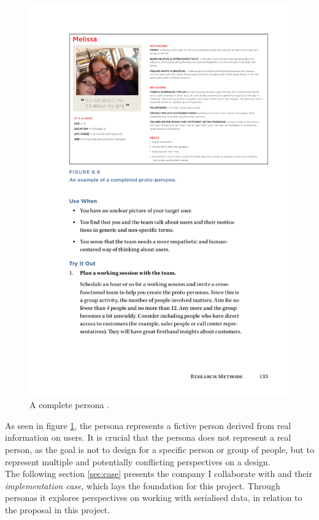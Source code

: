 \documentclass[../report.tex]{subfiles}
\begin{document}
\begin{figure}[H]
\centering
\includegraphics[width=0.9\linewidth]{figures/persona.pdf}
\caption{A complete persona \cite[p. 133]{buley2013user}.}
\label{fig:persona}
\end{figure}

As seen in figure \ref{fig:persona}, the persona represents a fictive person derived from real information on users. It is crucial that the persona does not represent a real person, as the goal is not to design for a specific person or group of people, but to represent multiple and potentially conflicting perspectives on a design. \\

The following section \ref{sec:case} presents the company I collaborate with and their \textit{implementation case}, which lays the foundation for this project. Through personas it explores perspectives on working with serialised data, in relation to the proposal in this project.
\end{document}

